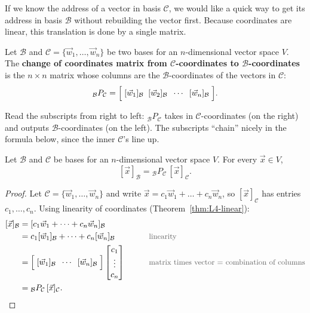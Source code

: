 \begin{intuition}
If we know the address of a vector in basis $\mathcal{C}$, we would like a quick way to get its address in basis $\mathcal{B}$ without rebuilding the vector first. Because coordinates are linear, this translation is done by a single matrix.
\end{intuition}

\begin{definition}
Let $\mathcal{B}$ and $\mathcal{C} = \{\vec{w}_1, \dots, \vec{w}_n\}$ be two bases for an $n$-dimensional vector space $V$. The \textbf{change of coordinates matrix from $\mathcal{C}$-coordinates to $\mathcal{B}$-coordinates} is the $n \times n$ matrix whose columns are the $\mathcal{B}$-coordinates of the vectors in $\mathcal{C}$:
\[
{}_{\mathcal{B}}P_{\mathcal{C}} = \Bigl[\; [\vec{w}_1]_{\mathcal{B}} \;\; [\vec{w}_2]_{\mathcal{B}} \;\; \cdots \;\; [\vec{w}_n]_{\mathcal{B}} \;\Bigr].
\]
\end{definition}

\begin{remark}
Read the subscripts from right to left: ${}_{\mathcal{B}}P_{\mathcal{C}}$ takes in $\mathcal{C}$-coordinates (on the right) and outputs $\mathcal{B}$-coordinates (on the left). The subscripts ``chain'' nicely in the formula below, since the inner $\mathcal{C}$'s line up.
\end{remark}

\begin{theorem}\label{thm:L4-change}
Let $\mathcal{B}$ and $\mathcal{C}$ be bases for an $n$-dimensional vector space $V$. For every $\vec{x} \in V$,
\[
[\vec{x}]_{\mathcal{B}} = {}_{\mathcal{B}}P_{\mathcal{C}}\,[\vec{x}]_{\mathcal{C}}.
\]
\end{theorem}

\begin{proof}
Let $\mathcal{C} = \{\vec{w}_1, \dots, \vec{w}_n\}$ and write $\vec{x} = c_1\vec{w}_1 + \dots + c_n\vec{w}_n$, so $[\vec{x}]_{\mathcal{C}}$ has entries $c_1, \dots, c_n$. Using linearity of coordinates (Theorem~\ref{thm:L4-linear}):
\begin{alignat*}{2}
[\vec{x}]_{\mathcal{B}} &= [c_1\vec{w}_1 + \dots + c_n\vec{w}_n]_{\mathcal{B}} && \\
&= c_1[\vec{w}_1]_{\mathcal{B}} + \dots + c_n[\vec{w}_n]_{\mathcal{B}} &\qquad& \by{linearity} \\
&= \Bigl[\; [\vec{w}_1]_{\mathcal{B}} \;\; \cdots \;\; [\vec{w}_n]_{\mathcal{B}} \;\Bigr] \begin{bmatrix} c_1 \\ \vdots \\ c_n \end{bmatrix} && \by{matrix times vector = combination of columns} \\
&= {}_{\mathcal{B}}P_{\mathcal{C}}\,[\vec{x}]_{\mathcal{C}}. &&
\end{alignat*}
\end{proof}

